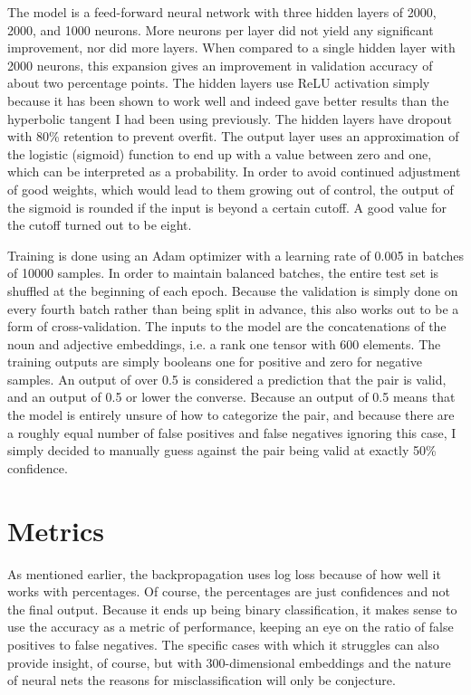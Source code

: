 \documentclass{article}
\begin{document}
The model is a feed-forward neural network with three hidden layers of 2000, 2000, and 1000 neurons. More neurons per layer did not yield any significant improvement, nor did more layers. When compared to a single hidden layer with 2000 neurons, this expansion gives an improvement in validation accuracy of about two percentage points. The hidden layers use ReLU activation simply because it has been shown to work well and indeed gave better results than the hyperbolic tangent I had been using previously. The hidden layers have dropout with 80\% retention to prevent overfit. The output layer uses an approximation of the logistic (sigmoid) function to end up with a value between zero and one, which can be interpreted as a probability. In order to avoid continued adjustment of good weights, which would lead to them growing out of control, the output of the sigmoid is rounded if the input is beyond a certain cutoff. A good value for the cutoff turned out to be eight.

Training is done using an Adam optimizer with a learning rate of 0.005 in batches of 10000 samples. In order to maintain balanced batches, the entire test set is shuffled at the beginning of each epoch. Because the validation is simply done on every fourth batch rather than being split in advance, this also works out to be a form of cross-validation. The inputs to the model are the concatenations of the noun and adjective embeddings, i.e. a rank one tensor with 600 elements. The training outputs are simply booleans \textemdash one for positive and zero for negative samples. An output of over 0.5 is considered a prediction that the pair is valid, and an output of 0.5 or lower the converse. Because an output of 0.5 means that the model is entirely unsure of how to categorize the pair, and because there are a roughly equal number of false positives and false negatives ignoring this case, I simply decided to manually guess against the pair being valid at exactly 50\% confidence.


\section{Metrics}

As mentioned earlier, the backpropagation uses log loss because of how well it works with percentages. Of course, the percentages are just confidences and not the final output. Because it ends up being binary classification, it makes sense to use the accuracy as a metric of performance, keeping an eye on the ratio of false positives to false negatives. The specific cases with which it struggles can also provide insight, of course, but with 300-dimensional embeddings and the nature of neural nets the reasons for misclassification will only be conjecture.
\end{document}

